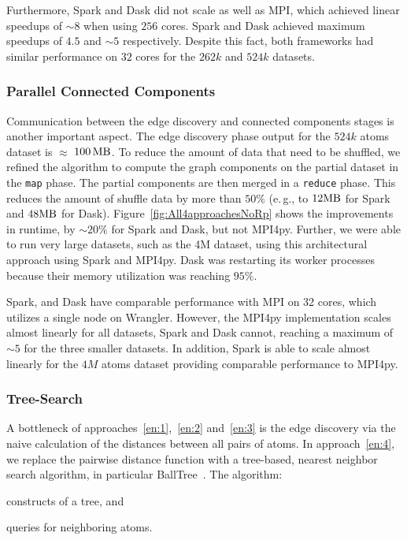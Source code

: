 Furthermore, Spark and Dask did not scale as well as MPI, which achieved linear speedups of $\sim8$ when using $256$ cores.
Spark and Dask achieved maximum speedups of $4.5$ and $\sim5$ respectively.
Despite this fact, both frameworks had similar performance on $32$ cores for the $262k$ and $524k$ datasets.


\subsubsection*{Parallel Connected Components}
Communication between the edge discovery and connected components stages is another important aspect.
The edge discovery phase output for the $524k$ atoms dataset is $\approx$ $100\,\textup{MB}$.
To reduce the amount of data that need to be shuffled, we refined the algorithm to compute the graph components on the partial dataset in the \texttt{map} phase.
The partial components are then merged in a \texttt{reduce} phase.
This reduces the amount of shuffle data by more than $50\%$ (e.\,g., to $12\textup{MB}$ for Spark and $48\textup{MB}$ for Dask).
Figure~\ref{fig:All4approachesNoRp} shows the improvements in runtime, by $\sim20\%$ for Spark and Dask, but not MPI4py.
Further, we were able to run very large datasets, such as the 4M dataset, using this architectural approach using Spark and MPI4py.
Dask was restarting its worker processes because their memory utilization was reaching $95\%$.

Spark, and Dask have comparable performance with MPI on 32 cores, which utilizes a single node on Wrangler.
However, the MPI4py implementation scales almost linearly for all datasets, Spark and Dask cannot, reaching a maximum of $\sim5$ for the three smaller datasets.
In addition, Spark is able to scale almost linearly for the $4M$ atoms dataset providing comparable performance to MPI4py.


\subsubsection*{Tree-Search}
A bottleneck of approaches~\ref{en:1},~\ref{en:2} and~\ref{en:3} is the edge 
discovery via the naive calculation of the distances between all pairs of atoms. 
In approach~\ref{en:4}, we replace the pairwise distance function with a tree-based, 
nearest neighbor search algorithm, in particular BallTree~\cite{omohundro89five}. 
The algorithm: 
\begin{inparaenum}
    \item constructs of a tree, and
    \item queries for neighboring atoms.
\end{inparaenum}


